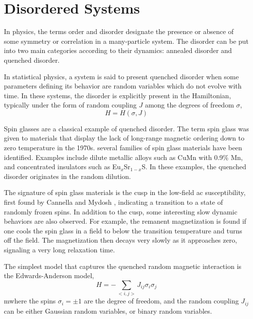 \section{Disordered Systems}
In physics, the terms order and disorder designate the presence or absence of 
some symmetry or correlation in a many-particle system. 
The disorder can be put into two main categories according to their dynamics: 
annealed disorder and quenched disorder.

In statistical physics, a system is said to present quenched disorder when 
some parameters defining its behavior are random variables which do not evolve 
with time. In these systems, the disorder is explicitly present in the Hamiltonian, 
typically under the form of random coupling $J$ among the degrees of freedom $\sigma$,
\begin{equation}
  \label{eq:4}
  H=H(\sigma,J)
\end{equation}

Spin glasses \cite{Binder-Young-1986} are a classical example of quenched disorder. 
The term spin glass was given to materials that display the lack of long-range
magnetic ordering down to zero temperature in the 1970s. 
several families of spin glass materials have been identified. Examples include 
dilute metallic alloys such as CuMn with 0.9\% Mn, and concentrated insulators 
such as Eu$_x$Sr$_{1-x}$S.
In these examples, the quenched disorder originates in the random dilution.  

The signature of spin glass materials is the cusp in the low-field ac susceptibility,
first found by Cannella and Mydosh \cite{PhysRevB.6.4220}, indicating a transition to a state of 
randomly frozen spins. 
In addition to the cusp, some interesting slow dynamic 
behaviors are also observed. For example, the remanent magnetization is found 
if one cools the spin glass in a field to below the transition temperature and 
turns off the field. The magnetization then decays very slowly as it approaches 
zero, signaling a very long relaxation time. 


The simplest model that captures the quenched random magnetic interaction
is the Edwards-Anderson model\cite{Edwards-Anderson1975},
\begin{equation}
  \label{eq:11}
  H=-\sum_{<i,j>}J_{ij}\sigma_i\sigma_j
\end{equation}
mwhere the spins $\sigma_i=\pm 1$ are the degree of freedom, and the random coupling
$J_{ij}$ can be either Gaussian random variables, or binary random variables.

